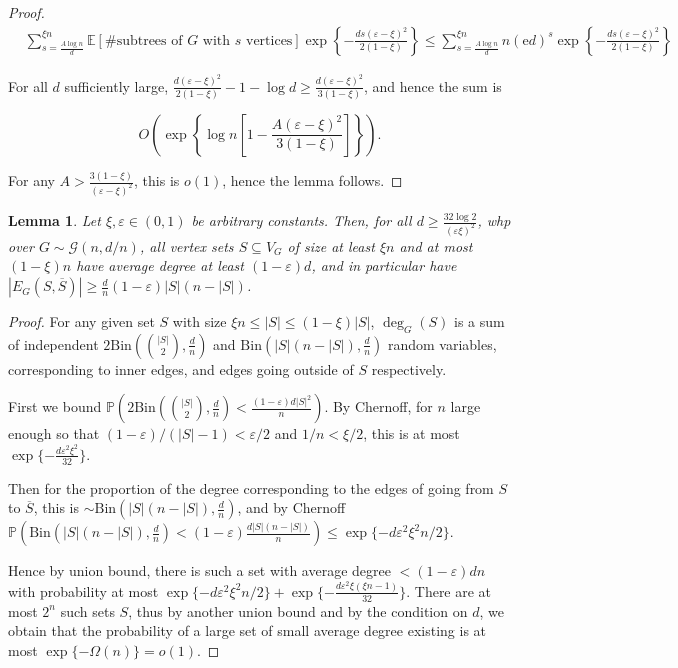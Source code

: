 \documentclass[11pt]{article}
\theoremstyle{plain}
\newtheorem{lemma}[theorem]{Lemma}
\let\epsilon=\varepsilon
\newcommand{\G}{\mathcal{G}}
\newcommand{\emm}{\mathrm{e}}
\newcommand{\E}{\mathds{E}}
\renewcommand{\P}{\mathds{P}}
\newcommand{\1}{\mathbb{1}}
\newcommand{\Bin}{\text{Bin}}
\begin{document}
\begin{proof}
    \begin{align*}
        &\sum_{s=\frac{A\log n}{d}}^{\xi n} \E[\#\text{subtrees of } G\text{ with }s\text{ vertices}] \exp\left\{-\frac{ds(\epsilon-\xi)^2}{2(1-\xi)}\right\} \leq\sum_{s=\frac{A\log n}{d}}^{\xi n} n(\emm d)^s \exp\left\{-\frac{ds(\epsilon-\xi)^2}{2(1-\xi)}\right\}
    \end{align*}

    For all \(d\) sufficiently large, \(\frac{d(\epsilon-\xi)^2}{2(1-\xi)} - 1 - \log d \geq \frac{d(\epsilon-\xi)^2}{3(1-\xi)}\), and hence the sum is
    
    \[
    O\left(\exp\left\{\log n\left[1-\frac{A(\epsilon-\xi)^2}{3(1-\xi)}\right]\right\}\right).
    \]

    For any \(A > \frac{3(1-\xi)}{(\epsilon-\xi)^2}\), this is \(o(1)\), hence the lemma follows.
\end{proof}


\begin{lemma}\label{lem:avg-deg-of-medium-sets}
    Let \(\xi, \epsilon \in (0,1)\) be arbitrary constants. Then, for all \(d\geq\frac{32\log 2}{(\epsilon\xi)^2}\), whp over \(G\sim\G(n,d/n)\), all vertex sets \(S\subseteq V_G\) of size at least \(\xi n\) and at most \((1-\xi)n\) have average degree at least \((1-\epsilon)d\), and in particular have \(|E_G(S,\overline S)|\geq \frac{d}{n}(1-\epsilon)|S|(n-|S|)\).
\end{lemma}
\begin{proof}
    For any given set \(S\) with size \(\xi n\leq|S|\leq(1-\xi)|S|\), \(\deg_G(S)\) is a sum of independent \(2\Bin(\binom{|S|}{2}, \tfrac dn)\) and \(\Bin(|S|(n-|S|), \tfrac dn)\) random variables, corresponding to inner edges, and edges going outside of \(S\) respectively.

    First we bound \(\P(2\Bin(\binom{|S|}{2}, \tfrac dn)<\tfrac{(1-\epsilon)d|S|^2}{n})\). By Chernoff, for \(n\) large enough so that \((1-\epsilon)/(|S|-1) < \epsilon / 2\) and \(1/n < \xi / 2\),
this is at most \(\exp\{-\frac{d\epsilon^2 \xi^2}{32}\}\).

    Then for the proportion of the degree corresponding to the edges of going from \(S\) to \(\overline S\), this is \(\sim\Bin(|S|(n-|S|),\tfrac dn)\), and by Chernoff \(\P(\Bin(|S|(n-|S|), \tfrac dn)<(1-\epsilon)\frac{d|S|(n-|S|)}{n})\leq \exp\{-d\epsilon^2 \xi^2 n/2\}\). 


    Hence by union bound, there is such a set with average degree \(<(1-\epsilon)dn\) with probability at most \(\exp\{-d\epsilon^2 \xi^2 n/2\} + \exp\{-\frac{d\epsilon^2 \xi(\xi n - 1)}{32}\}\). There are at most \(2^n\) such sets \(S\), thus by another union bound and by the condition on \(d\), we obtain that the probability of a large set of small average degree existing is at most \(\exp\{-\Omega(n)\} = o(1)\).
\end{proof}
\end{document}
